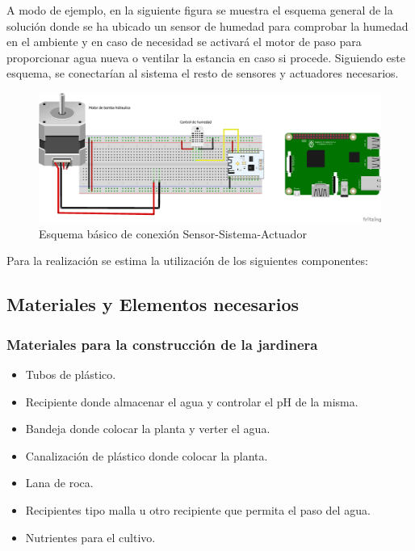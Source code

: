 \documentclass[12pt,a4paper,titlepage,oneside]{report}
\begin{document}
	A modo de ejemplo, en la siguiente figura se muestra el esquema general de la solución donde se ha ubicado un sensor de humedad para comprobar la humedad en el ambiente y en caso de necesidad se activará el motor de paso para proporcionar agua nueva o ventilar la estancia en caso si procede. Siguiendo este esquema, se conectarían al sistema el resto de sensores y actuadores necesarios.
	
	\begin{figure}
		\center
		\includegraphics[scale=0.5]{./images/Conexion.png}
		\caption{Esquema básico de conexión Sensor-Sistema-Actuador}
		\label{Esquema_basico}
	\end{figure}		
	
	Para la realización se estima la utilización de los siguientes componentes:	
	
	\subsection*{Materiales y Elementos necesarios}
	\subsubsection*{Materiales para la construcción de la jardinera}

		\begin{itemize}
			\item Tubos de plástico.
			\item Recipiente donde almacenar el agua y controlar el pH de la misma.
			\item Bandeja donde colocar la planta y verter el agua.
			\item Canalización de plástico donde colocar la planta.
			\item Lana de roca.
			\item Recipientes tipo malla u otro recipiente que permita el paso del agua.
			\item Nutrientes para el cultivo.
		\end{itemize}			
	
\end{document}
